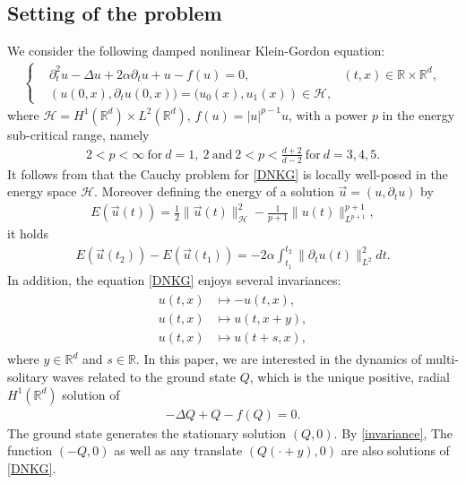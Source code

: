 \documentclass[reqno]{amsart}
\theoremstyle{plain}
\theoremstyle{definition}
\numberwithin{equation}{section}
\renewcommand{\r}{\right}
\newcommand{\1}{\mathbbm{1}}
\begin{document}
\subsection{Setting of the problem}
We consider the following damped nonlinear Klein-Gordon equation:
\begin{align}
\label{DNKG}
\tag{DNKG}
	\left\{
	\begin{aligned}
		&\partial_{t}^2u-\Delta u+2\alpha \partial_{t}u+u-f(u)=0, & (t,x) \in \mathbb{R} \times \mathbb{R}^d,
		\\
		&\left(u(0,x),{\partial}_tu(0,x))=(u_{0}(x), u_1(x)\right)\in \mathcal{H},
	\end{aligned}
	\r.
\end{align}
where $\mathcal{H}=H^1(\mathbb{R}^d)\times L^2(\mathbb{R}^d)$, $f(u)=|u|^{p-1}u$, with a power $p$ in the energy sub-critical range, namely
\begin{align*}
2<p<\infty \ \mbox{for}\ d=1,\ 2\ \mbox{and}\ 2<p<\frac{d+2}{d-2}\ \mbox{for}\ d=3,4,5.
\end{align*}
It follows from \cite{BRS} that the Cauchy problem for \eqref{DNKG} is locally well-posed in the energy space $\mathcal{H}$. Moreover defining the energy of a solution $\vec{u}=(u, {\partial}_tu)$ by
\begin{align*}
	E(\vec{u}(t))=\frac{1}{2}\|\vec{u}(t)\|_{\mathcal{H}}^2-\frac{1}{p+1}\| u(t)\|_{L^{p+1}}^{p+1},
\end{align*}
it holds 
\begin{align}\label{energydecay}
	E(\vec{u}(t_2))-E(\vec{u}(t_1))=-2\alpha \int_{t_1}^{t_2} \| {\partial}_tu(t)\|_{L^2}^2dt.
\end{align}
In addition, the equation \eqref{DNKG} enjoys several invariances:
\begin{align}\label{invariance}
\begin{aligned}
u(t,x)&\mapsto -u(t,x),
\\
u(t,x)&\mapsto u(t,x+y),
\\
u(t,x)&\mapsto u(t+s,x),
\end{aligned}
\end{align}
where $y\in \mathbb{R}^d$ and $s\in \mathbb{R}$. In this paper, we are interested in the dynamics of multi-solitary waves related to the ground state $Q$, which is the unique positive, radial $H^1(\mathbb{R}^d)$ solution of 
\begin{align}\label{Qode}
-\Delta Q+Q-f(Q)=0.
\end{align}
The ground state generates the stationary solution $(Q,0)$. By \eqref{invariance}, The function $(-Q,0)$ as well as any translate $(Q(\cdot+y),0)$ are also solutions of \eqref{DNKG}.
\end{document}
